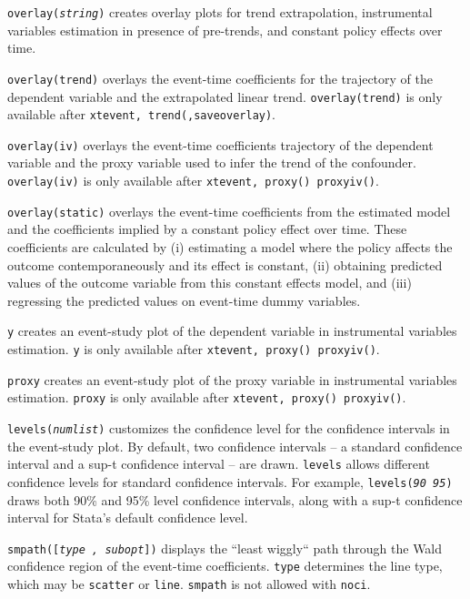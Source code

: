 \documentclass[bib]{./sty/statapress}
\begin{document}
\hangpara
\texttt{overlay({\it string})} creates overlay plots for trend extrapolation, instrumental variables estimation in presence of pre-trends, and constant policy effects over time.

\morehangpara
\texttt{overlay(trend)} overlays the event-time coefficients for the trajectory of the dependent variable and the extrapolated linear trend.
\texttt{overlay(trend)} is only available after \texttt{xtevent, trend(,saveoverlay)}.

\morehangpara
\texttt{overlay(iv)} overlays the event-time coefficients trajectory of the dependent variable and the proxy variable used to infer the trend of the confounder.
\texttt{overlay(iv)} is only available after \texttt{xtevent, proxy() proxyiv()}.

\morehangpara
\texttt{overlay(static)} overlays the event-time coefficients from the estimated model and the coefficients implied by a constant policy effect over time.
These coefficients are calculated by
(i) estimating a model where the policy affects the outcome contemporaneously and its effect is constant,
(ii) obtaining predicted values of the outcome variable from this constant effects model, and
(iii) regressing the predicted values on event-time dummy variables.

\hangpara
\texttt{y} creates an event-study plot of the dependent variable in instrumental variables estimation.
\texttt{y} is only available after \texttt{xtevent, proxy() proxyiv()}.

\hangpara
\texttt{proxy} creates an event-study plot of the proxy variable in instrumental variables estimation.
\texttt{proxy} is only available after \texttt{xtevent, proxy() proxyiv()}.

\hangpara
\texttt{levels({\it numlist})} customizes the confidence level for the confidence intervals in the event-study plot.
By default, two confidence intervals -- a standard confidence interval and a sup-t confidence interval --  are drawn.
\texttt{levels} allows different confidence levels for standard confidence intervals.
For example, \texttt{levels({\it 90 95})} draws both 90\% and 95\% level confidence intervals, along with a sup-t confidence interval for Stata's default confidence level.

\hangpara
\texttt{smpath([{\it type , subopt}])} displays the ``least wiggly`` path through the Wald confidence region of the event-time coefficients.
\texttt{type} determines the line type, which may be \texttt{scatter} or \texttt{line}.
\texttt{smpath} is not allowed with \texttt{noci}.
\end{document}
